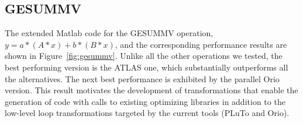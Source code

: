 \documentclass[runningheads]{llncs}
\begin{document}
%


\subsection{GESUMMV}


The extended Matlab code for the GESUMMV operation, $y = a * (A * x) + b * (B * x)$,
and the corresponding performance results are shown in Figure~\ref{fig:gesummv}. Unlike all the other operations we tested, the best performing version is the ATLAS one, which substantially outperforms all the alternatives. The next best performance is exhibited by the parallel Orio version. This result motivates the development of transformations that enable the generation of code with calls to existing optimizing libraries in addition to the low-level loop transformations targeted by the current tools (PLuTo and Orio).
\end{document}
